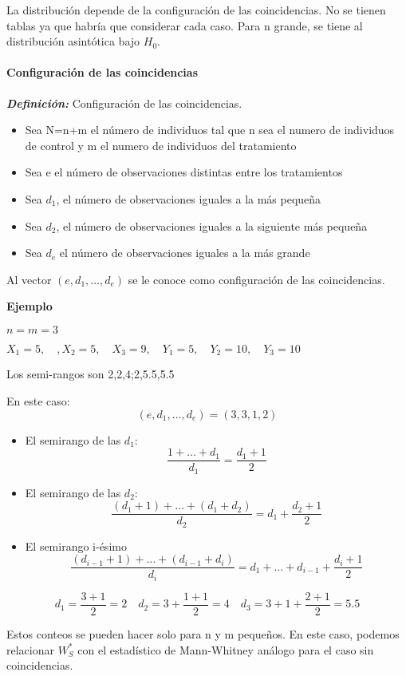 La distribución depende de la configuración de las coincidencias. No se tienen tablas ya que habría que considerar cada caso.
Para n grande, se tiene al distribución asintótica bajo $H_0$.

\paragraph{Configuración de las coincidencias}

\textit{\textbf{Definición: }}Configuración de las coincidencias. 
\begin{itemize}
    \item Sea N=n+m el número de individuos tal que n sea el numero de individuos de control y m el numero de individuos del tratamiento
    \item Sea e el número de observaciones distintas entre los tratamientos
    \item Sea $d_1$, el número de observaciones iguales a la más pequeña
    \item Sea $d_2$, el número de observaciones iguales a la siguiente más pequeña
    \item Sea $d_e$ el número de observaciones iguales a la más grande
\end{itemize}

Al vector $(e,d_1,\dots,d_e)$ se le conoce como configuración de las coincidencias.

\textbf{Ejemplo}

$n=m=3$

\(
X_1=5, \quad, X_2=5, \quad X_3=9, \quad Y_1=5,\quad Y_2=10,\quad Y_3=10
\)

Los semi-rangos son 2,2,4;2,5.5,5.5

En este caso:
\[
    (e,d_1,\dots,d_e)=(3,3,1,2)
\]
\begin{itemize}
    \item El semirango de las $d_1$:
    \[
        \frac{1+\dots+d_1}{d_1}=\frac{d_1+1}{2}
    \]
    \item El semirango de las $d_2$:
    \[
        \frac{(d_1+1)+\dots+(d_1+d_2)}{d_2}=d_1+\frac{d_2+1}{2}
    \]
    \item El semirango i-ésimo
    \[
        \frac{(d_{i-1}+1)+\dots+(d_{i-1}+d_i)}{d_i}=d_1+\dots+d_{i-1}+\frac{d_i+1}{2}
    \]
\end{itemize}

\[
    d_1=\frac{3+1}{2}=2 \quad d_2=3+\frac{1+1}{2}=4 \quad d_3=3+1+\frac{2+1}{2}=5.5
\]

Estos conteos se pueden hacer solo para n y m pequeños. En este caso, podemos relacionar $W_S^*$ con el estadístico de Mann-Whitney análogo para el caso sin coincidencias.

